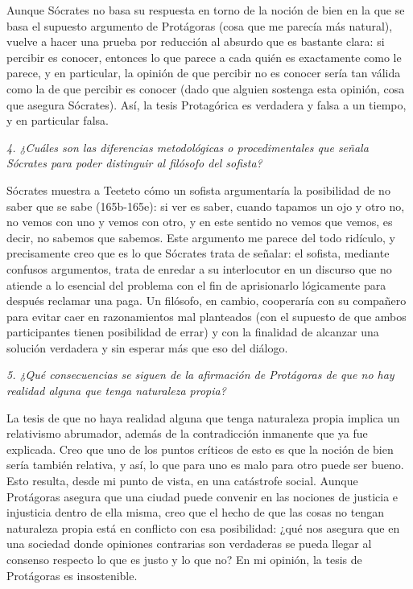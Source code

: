 Aunque Sócrates no basa su respuesta en torno
de la noción de bien en la que se basa el
supuesto argumento de Protágoras (cosa que me
parecía más natural), vuelve a hacer una
prueba por reducción al absurdo que es
bastante clara: si percibir es conocer,
entonces lo que parece a cada quién es
exactamente como le parece, y en particular,
la opinión de que percibir no es conocer
sería tan válida como la de que percibir es
conocer (dado que alguien sostenga esta
opinión, cosa que asegura Sócrates). Así, la
tesis Protagórica es verdadera y falsa a un
tiempo, y en particular falsa.

\medskip\noindent\emph{4. ¿Cuáles son las
diferencias metodológicas o procedimentales
que señala Sócrates para poder distinguir al
filósofo del sofista?}

Sócrates muestra a Teeteto cómo un sofista
argumentaría la posibilidad de no saber que
se sabe (165b-165e): si ver es saber, cuando
tapamos un ojo y otro no, no vemos con uno y
vemos con otro, y en este sentido no vemos
que vemos, es decir, no sabemos que sabemos.
Este argumento me parece del todo ridículo, y
precisamente creo que es lo que Sócrates
trata de señalar: el sofista, mediante
confusos argumentos, trata de enredar a su
interlocutor en un discurso que no atiende a
lo esencial del problema con el fin de
aprisionarlo lógicamente para después
reclamar una paga. Un filósofo, en cambio,
cooperaría con su compañero para evitar caer
en razonamientos mal planteados (con el
supuesto de que ambos participantes tienen
posibilidad de errar) y con la finalidad de
alcanzar una solución verdadera y sin esperar
más que eso del diálogo.

\medskip\noindent\emph{5. ¿Qué consecuencias
se siguen de la afirmación de Protágoras de
que no hay realidad alguna que tenga
naturaleza propia?}

La tesis de que no haya realidad alguna que
tenga naturaleza propia implica un
relativismo abrumador, además de la
contradicción inmanente que ya fue explicada.
Creo que uno de los puntos críticos de esto
es que la noción de bien sería también
relativa, y así, lo que para uno es malo para
otro puede ser bueno. Esto resulta, desde mi
punto de vista, en una catástrofe social.
Aunque Protágoras asegura que una ciudad
puede convenir en las nociones de justicia e
injusticia dentro de ella misma, creo que el
hecho de que las cosas no tengan naturaleza
propia está en conflicto con esa posibilidad:
¿qué nos asegura que en una sociedad donde
opiniones contrarias son verdaderas se pueda
llegar al consenso respecto lo que es justo y
lo que no? En mi opinión, la tesis de
Protágoras es insostenible.

